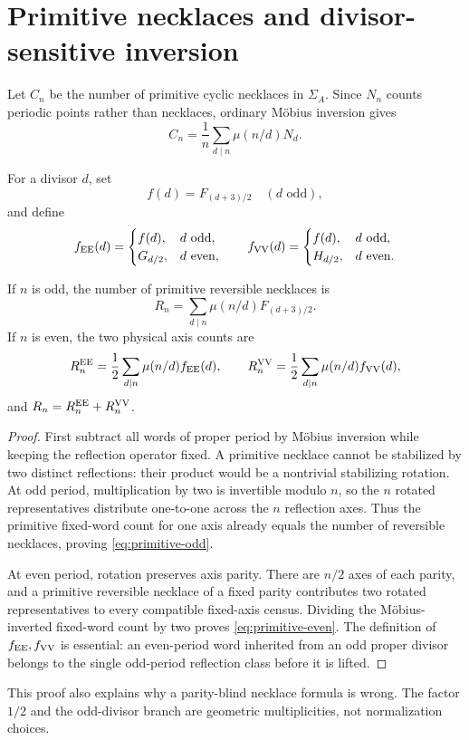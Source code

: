 \section{Primitive necklaces and divisor-sensitive inversion}

Let $C_n$ be the number of primitive cyclic necklaces in $\Sigma_A$.  Since
$N_n$ counts periodic points rather than necklaces, ordinary M\"obius
inversion gives
\begin{equation}\label{eq:primitive-all}
C_n=\frac1n\sum_{d\mid n}\mu(n/d)N_d.
\end{equation}

For a divisor $d$, set
\[
f(d)=F_{(d+3)/2}\quad(d\text{ odd}),
\]
and define
\[
f_{\mathrm{EE}}(d)=
\begin{cases}f(d),&d\text{ odd},\\G_{d/2},&d\text{ even},\end{cases}
\qquad
f_{\mathrm{VV}}(d)=
\begin{cases}f(d),&d\text{ odd},\\H_{d/2},&d\text{ even}.
\end{cases}
\]

\begin{theorem}\label{thm:primitive}
If $n$ is odd, the number of primitive reversible necklaces is
\begin{equation}\label{eq:primitive-odd}
R_n=\sum_{d\mid n}\mu(n/d)F_{(d+3)/2}.
\end{equation}
If $n$ is even, the two physical axis counts are
\begin{equation}\label{eq:primitive-even}
R_n^{\mathrm{EE}}=\frac12\sum_{d\mid n}\mu(n/d)f_{\mathrm{EE}}(d),
\qquad
R_n^{\mathrm{VV}}=\frac12\sum_{d\mid n}\mu(n/d)f_{\mathrm{VV}}(d),
\end{equation}
and $R_n=R_n^{\mathrm{EE}}+R_n^{\mathrm{VV}}$.
\end{theorem}

\begin{proof}
First subtract all words of proper period by M\"obius inversion while keeping
the reflection operator fixed.  A primitive necklace cannot be stabilized by
two distinct reflections: their product would be a nontrivial stabilizing
rotation.  At odd period, multiplication by two is invertible modulo $n$, so
the $n$ rotated representatives distribute one-to-one across the $n$
reflection axes.  Thus the primitive fixed-word count for one axis already
equals the number of reversible necklaces, proving \eqref{eq:primitive-odd}.

At even period, rotation preserves axis parity.  There are $n/2$ axes of each
parity, and a primitive reversible necklace of a fixed parity contributes two
rotated representatives to every compatible fixed-axis census.  Dividing
the M\"obius-inverted fixed-word count by two proves
\eqref{eq:primitive-even}.  The definition of $f_{\mathrm{EE}},f_{\mathrm{VV}}$ is essential:
an even-period word inherited from an odd proper divisor belongs to the
single odd-period reflection class before it is lifted.
\end{proof}

This proof also explains why a parity-blind necklace formula is wrong.  The
factor $1/2$ and the odd-divisor branch are geometric multiplicities, not
normalization choices.
